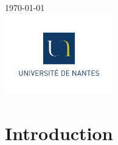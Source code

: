 \begin{titlepage}

{\large \today}\\[2cm] %



\includegraphics[width=4.7cm]{logo.jpg}\\%


\newpage %

\end{titlepage}

\renewcommand{\contentsname}{Sommaire}
\tableofcontents
\newpage


\newcommand{\tab}{\hspace{1cm}}
\newcommand{\red}{\textcolor{red}}
\newcommand{\grn}{\textcolor{aogreen}}

\section{Introduction}
\label{sec:introduction}

